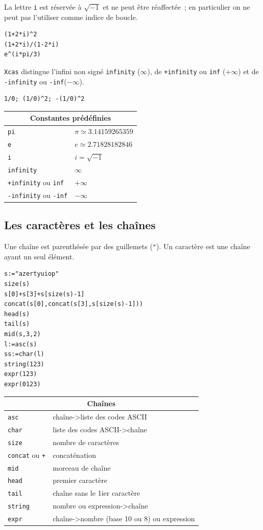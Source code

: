 \documentclass{article}
\begin{document}
La lettre \verb|i| est r\'eserv\'ee \`a $\sqrt{-1}$ et ne peut \^etre
r\'eaffect\'ee~; en particulier on ne peut pas l'utiliser comme indice
de boucle.
\begin{verbatim}
(1+2*i)^2
(1+2*i)/(1-2*i)
e^(i*pi/3)
\end{verbatim}
{\tt Xcas} distingue l'infini non sign\'e \verb|infinity| ($\infty$), de
\verb|+infinity| ou \verb|inf| ($+\infty$) et de \verb|-infinity|  
ou \verb|-inf|($-\infty$).
\begin{verbatim}
1/0; (1/0)^2; -(1/0)^2 
\end{verbatim}

\begin{center}
\begin{tabular}{|ll|}
\hline
\multicolumn{2}{|c|}{\bf Constantes pr\'ed\'efinies}\\
\hline\hline
\verb|pi|&$\pi\simeq 3.14159265359$ \\
\verb|e|&$e\simeq 2.71828182846$  \\
\verb|i|&$i=\sqrt{-1}$  \\
\verb|infinity|&$\infty$  \\
\verb|+infinity| ou \verb|inf|&$+\infty$  \\
\verb|-infinity| ou \verb|-inf|&$-\infty$  \\
\hline
\end{tabular}
\end{center}
%
\subsection{Les caract\`eres et les cha\^{i}nes}
%
Une cha\^{i}ne est parenth\'es\'ee par des guillemets ({\tt "}).
Un caract\`ere est une cha\^{i}ne ayant un seul \'el\'ement.
\begin{verbatim}
s:="azertyuiop"
size(s)
s[0]+s[3]+s[size(s)-1]
concat(s[0],concat(s[3],s[size(s)-1]))
head(s)
tail(s)
mid(s,3,2)
l:=asc(s)
ss:=char(l)
string(123)
expr(123)
expr(0123)
\end{verbatim}

\begin{center}
\begin{tabular}{|ll|}
\hline
\multicolumn{2}{|c|}{\bf Cha\^{i}nes}\\
\hline\hline
\verb|asc|&cha\^{i}ne->liste des codes ASCII \\
\verb|char|&liste des codes ASCII->cha\^{i}ne \\
\verb|size|&nombre de caract\`eres \\
\verb|concat| ou \verb|+| &concat\'enation  \\
\verb|mid|&morceau de cha\^{i}ne\\
\verb|head|&premier caract\`ere  \\
\verb|tail|&cha\^{i}ne sans le 1ier caract\`ere\\
\verb|string|&nombre ou expression->cha\^{i}ne  \\
\verb|expr|&cha\^{i}ne->nombre (base 10 ou 8) ou expression  \\
\hline
\end{tabular}
\end{center}%
\end{document}
